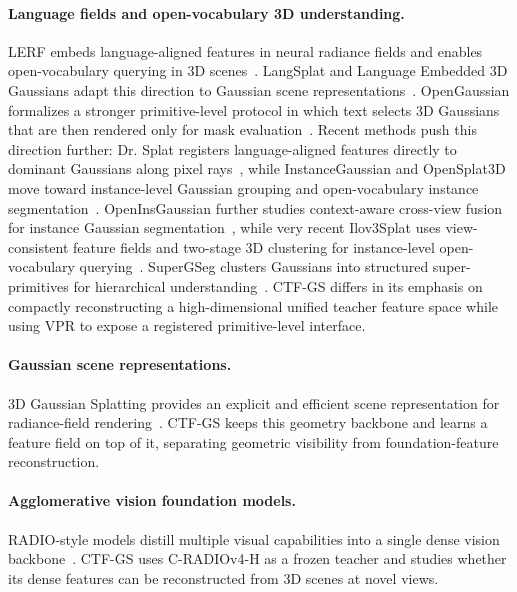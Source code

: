 \documentclass[10pt,twocolumn,letterpaper]{article}
\newcommand{\method}{CTF-GS}
\newcommand{\radio}{C-RADIOv4-H}
\begin{document}
\paragraph{Language fields and open-vocabulary 3D understanding.}
LERF embeds language-aligned features in neural radiance fields and enables
open-vocabulary querying in 3D scenes~\cite{kerr2023lerf}. LangSplat and
Language Embedded 3D Gaussians adapt this direction to Gaussian scene
representations~\cite{qin2024langsplat,shi2024legaussians}. OpenGaussian
formalizes a stronger primitive-level protocol in which text selects 3D
Gaussians that are then rendered only for mask
evaluation~\cite{wu2024opengaussian}. Recent methods push this direction
further: Dr. Splat registers language-aligned features directly to dominant
Gaussians along pixel rays~\cite{kim2025drsplat}, while InstanceGaussian and
OpenSplat3D move toward instance-level Gaussian grouping
and open-vocabulary instance segmentation~\cite{li2025instancegaussian,piekenbrinck2025opensplat3d}.
OpenInsGaussian further studies context-aware cross-view fusion for instance
Gaussian segmentation~\cite{huang2025openinsgaussian}, while very recent
Ilov3Splat uses view-consistent feature fields and two-stage 3D clustering for
instance-level open-vocabulary querying~\cite{nguyen2026ilov3splat}.
SuperGSeg clusters Gaussians into structured super-primitives for hierarchical
understanding~\cite{liang2026supergseg}. \method{} differs in its emphasis on
compactly reconstructing a high-dimensional unified teacher feature space while
using VPR to expose a registered primitive-level interface.

\paragraph{Gaussian scene representations.}
3D Gaussian Splatting provides an explicit and efficient scene representation
for radiance-field rendering~\cite{kerbl2023gaussians}. \method{} keeps this
geometry backbone and learns a feature field on top of it, separating geometric
visibility from foundation-feature reconstruction.

\paragraph{Agglomerative vision foundation models.}
RADIO-style models distill multiple visual capabilities into a single dense
vision backbone~\cite{ranzinger2024radio,nvidia2026cradiov4}. \method{} uses
\radio{} as a frozen teacher and studies whether its dense features can be
reconstructed from 3D scenes at novel views.
\end{document}
